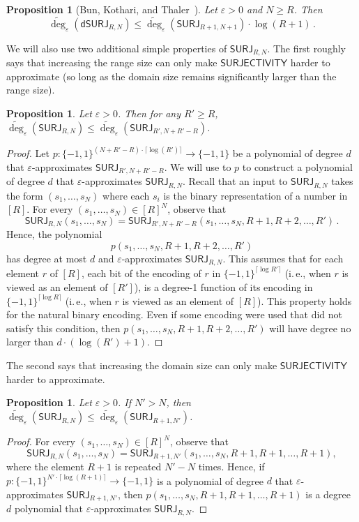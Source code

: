 \documentclass[11pt]{article}
\numberwithin{equation}{section}
\newtheorem{proposition}[theorem]{Proposition}
\theoremstyle{definition}
\theoremstyle{plain}
\newcommand{\ie}{i.\,e.}
\newcommand{\SURJ}{\mathsf{ SURJ}}
\newcommand{\dumSURJ}{\mathsf{dSURJ}}
\newcommand{\bits}{\{-1,1\}}
\newcommand{\eps}{\varepsilon}
\newcommand{\adeg}{\widetilde{\operatorname{deg}}}
\begin{document}
\begin{proposition}[Bun, Kothari, and Thaler~\cite{bkt}] \label{prop:dumsurj-reduction} \label{relatingdsurjtosurj}
	Let $\eps > 0$ and $N \ge R$. Then
	\[ \adeg_\eps(\dumSURJ_{R, N}) \le \adeg_\eps(\SURJ_{R + 1, N + 1}) \cdot \log(R+1)\,.\]
\end{proposition}

We will also use two additional simple properties of $\SURJ_{R, N}$. The first roughly says
that increasing the range size can only make $\mathsf{SURJECTIVITY}$ harder to approximate (so long as the domain
size remains significantly larger than the range size).

\begin{proposition} \label{yoursurjprop}
	Let $\eps > 0$. Then for any $R' \geq R$, $\adeg_{\eps}(\SURJ_{R, N}) \leq \adeg_{\eps}(\SURJ_{R', N + R' - R})$. 
\end{proposition}
\begin{proof}
	Let $p : \bits^{(N+R'-R) \cdot \lceil\log(R')\rceil} \to \bits$ be a polynomial of degree $d$ that $\eps$-approximates $\SURJ_{R', N +R' - R}$. We will use to $p$ to construct a polynomial of degree $d$ that $\eps$-approximates $\SURJ_{R, N}$. Recall that an input to $\SURJ_{R, N}$ takes the form $(s_1, \dots, s_N)$ where each $s_i$ is the binary representation of a number in $[R]$. 
	For every $(s_1, \dots, s_N) \in [R]^N$, observe that
	\[\SURJ_{R, N}(s_1, \dots, s_N) = \SURJ_{R', N+R'-R}(s_1, \dots, s_N, R+1, R+2, \dots, R')\,.\]
	Hence, the polynomial
	\[p(s_1, \dots, s_N, R+1, R+2, \dots, R')\]
	has degree at most $d$ and $\eps$-approximates $\SURJ_{R, N}$. This assumes
	that for each element $r$ of $[R]$, each bit of the encoding of $r$ in $\bits^{\lceil\log R'\rceil}$ (\ie, when $r$ is viewed as an element of $[R']$),
	is a degree-1 function of its encoding in $\bits^{\lceil \log R \rceil}$ (\ie, when $r$ is viewed as an element of $[R]$). This property 
	holds for the natural binary encoding. Even if some encoding were used that did not satisfy this %
	condition, %
	then $p(s_1, \dots, s_N, R+1, R+2, \dots, R')$ will have degree no larger than $d \cdot (\log(R') + 1)$.
\end{proof}

The second says that increasing the domain size can only make $\mathsf{SURJECTIVITY}$ harder to approximate. 
\begin{proposition} \label{yoursurjprop2}
	Let $\eps > 0$. If $N' > N$, then $\adeg_{\eps}(\SURJ_{R, N})  \leq \adeg_{\eps}(\SURJ_{R+1, N'})$.
\end{proposition}
\begin{proof}
	For every $(s_1, \dots, s_N) \in [R]^N$, observe that
	\[\SURJ_{R, N}(s_1, \dots, s_N) = \SURJ_{R+1, N'}(s_1, \dots, s_N, R+1, R+1, \dots, R+1),\]
	where the element $R+1$ is repeated $N'-N$ times. 
	Hence, if $p : \bits^{N' \cdot \lceil \log(R+1) \rceil} \to \bits$ is a polynomial of degree $d$ that $\eps$-approximates $\SURJ_{R+1, N'}$,
	then $p(s_1, \dots, s_N, R+1, R+1, \dots, R+1)$ is a degree $d$ polynomial that $\eps$-approximates $\SURJ_{R, N}$.
\end{proof}
\end{document}
